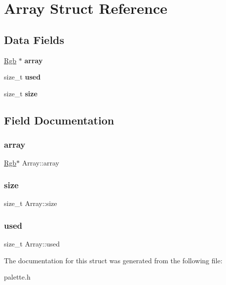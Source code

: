\hypertarget{struct_array}{}\section{Array Struct Reference}
\label{struct_array}
\subsection*{Data Fields}
\begin{DoxyCompactItemize}
\item 
\mbox{\label{struct_array_a1004bb52f35f927022e780a193612db1}} 
\hyperlink{struct_rgb}{Rgb} $\ast$ {\bfseries array}
\item 
\mbox{\label{struct_array_a6196b6388bc5b72dd2dea08e483a0c47}} 
size\+\_\+t {\bfseries used}
\item 
\mbox{\label{struct_array_a13f67ab957f4fdd3443d7f62b2fd09ce}} 
size\+\_\+t {\bfseries size}
\end{DoxyCompactItemize}


\subsection{Field Documentation}
\mbox{\label{struct_array_a1004bb52f35f927022e780a193612db1}} 
\subsubsection{\texorpdfstring{array}{array}}
{\footnotesize\ttfamily \hyperlink{struct_rgb}{Rgb}$\ast$ Array\+::array}

\mbox{\label{struct_array_a13f67ab957f4fdd3443d7f62b2fd09ce}} 
\subsubsection{\texorpdfstring{size}{size}}
{\footnotesize\ttfamily size\+\_\+t Array\+::size}

\mbox{\label{struct_array_a6196b6388bc5b72dd2dea08e483a0c47}} 
\subsubsection{\texorpdfstring{used}{used}}
{\footnotesize\ttfamily size\+\_\+t Array\+::used}



The documentation for this struct was generated from the following file\+:\begin{DoxyCompactItemize}
\item 
palette.\+h\end{DoxyCompactItemize}
